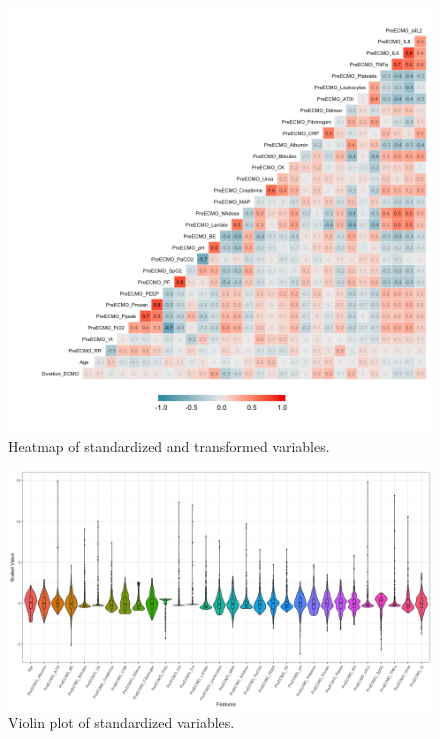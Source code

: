 \documentclass[12pt,]{article}
\begin{document}
\begin{figure}[H]

{\centering \includegraphics[width=1\linewidth]{images/heatmap_standardized} 

}

\caption{\label{fig.ensemble-imputation}Heatmap of standardized and transformed variables.}\label{fig:heatmap-standardized}
\end{figure}

\begin{figure}[H]

{\centering \includegraphics[width=1\linewidth]{images/violinplot} 

}

\caption{\label{fig.ensemble-imputation}Violin plot of standardized variables.}\label{fig:violin}
\end{figure}
\end{document}

